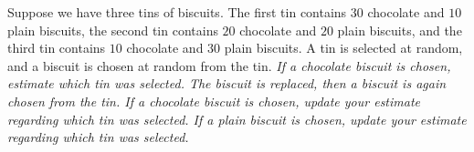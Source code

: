 \begin{example}\label{ex:biscuits}
Suppose we have three tins of biscuits. The first tin contains $30$ chocolate and $10$ plain biscuits, the second tin contains $20$ chocolate and $20$ plain biscuits, and the third tin contains $10$ chocolate and $30$ plain biscuits. A tin is selected at random, and a biscuit is chosen at random from the tin.
\ben
\it If a chocolate biscuit is chosen, estimate which tin was selected.
\een
The biscuit is replaced, then a biscuit is again chosen from the tin.
\ben{}
\it If a chocolate biscuit is chosen, update your estimate regarding which tin was selected.
\it If a plain biscuit is chosen, update your estimate regarding which tin was selected.
\een
\end{example}

